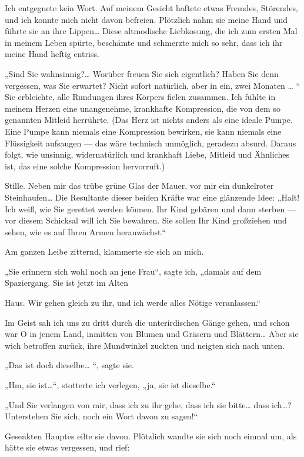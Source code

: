 Ich entgegnete kein Wort. Auf meinem Gesicht haftete etwas Fremdes,
Störendes, und ich konnte mich nicht davon befreien. Plötzlich nahm
sie meine Hand und führte sie an ihre Lippen\ldots{} Diese altmodische
Liebkosung, die ich zum ersten Mal in meinem Leben spürte,
beschämte und schmerzte mich so sehr, dass ich ihr meine Hand
heftig entriss.

„Sind Sie wahnsinnig?\ldots{} Worüber freuen Sie sich eigentlich? Haben
Sie denn vergessen, was Sie erwartet? Nicht sofort natürlich, aber
in ein, zwei Monaten \ldots{} “ Sie erbleichte, alle Rundungen ihres
Körpers fielen zusammen. Ich fühlte in meinem Herzen eine
unangenehme, krankhafte Kompression, die von dem so genannten
Mitleid herrührte. (Das Herz ist nichts anders als eine ideale
Pumpe. Eine Pumpe kann niemals eine Kompression bewirken, sie kann
niemals eine Flüssigkeit aufsaugen — das wäre technisch unmöglich,
geradezu absurd. Daraus folgt, wie unsinnig, widernatürlich und
krankhaft Liebe, Mitleid und Ähnliches ist, das eine solche
Kompression hervorruft.)

Stille. Neben mir das trübe grüne Glas der Mauer, vor mir ein
dunkelroter Steinhaufen\ldots{} Die Resultante dieser beiden Kräfte war
eine glänzende Idee: „Halt! Ich weiß, wie Sie gerettet werden
können. Ihr Kind gebären und dann sterben — vor diesem Schicksal
will ich Sie bewahren. Sie sollen Ihr Kind großziehen und sehen,
wie es auf Ihren Armen heranwächst.“

Am ganzen Leibe zitternd, klammerte sie sich an mich.

„Sie erinnern sich wohl noch an jene Frau“, sagte ich, „damals auf
dem Spaziergang. Sie ist jetzt im Alten

Haus. Wir gehen gleich zu ihr, und ich werde alles Nötige
veranlassen.“

Im Geist sah ich uns zu dritt durch die unterirdischen Gänge gehen,
und schon war O in jenem Land, inmitten von Blumen und Gräsern und
Blättern\ldots{} Aber sie wich betroffen zurück, ihre Mundwinkel zuckten
und neigten sich nach unten.

„Das ist doch dieselbe\ldots{} “, sagte sie.

„Hm, sie ist\ldots{}“, stotterte ich verlegen, „ja, sie ist dieselbe.“

„Und Sie verlangen von mir, dass ich zu ihr gehe, dass ich sie
bitte\ldots{} dass ich\ldots{}? Unterstehen Sie sich, noch ein Wort davon zu
sagen!“

Gesenkten Hauptes eilte sie davon. Plötzlich wandte sie sich noch
einmal um, als hätte sie etwas vergessen, und rief:

